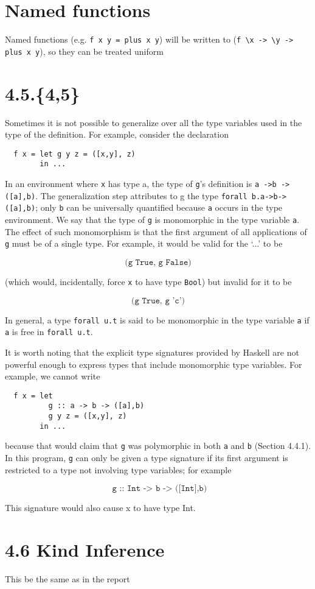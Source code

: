 \documentclass[12pt,a4paper,twoside]{article}
\begin{document}
\section{Named functions}

Named functions (e.g. \texttt{f x y = plus x y}) will be written to (\texttt{f \textbackslash x -> \textbackslash y -> plus x y}), so they can be treated uniform

\section{4.5.\{4,5\}}

Sometimes it is not possible to generalize over all the type variables used in the type of the definition. For example, consider the declaration 

\begin{verbatim}
  f x = let g y z = ([x,y], z)
        in ...
\end{verbatim}

In an environment where \texttt{x} has type a, the type of \texttt{g}'s definition is \texttt{a ->b ->([a],b)}. 
The generalization step attributes to g the type \texttt{forall b.a->b->([a],b)}; 
only \texttt{b} can be universally quantified because \texttt{a} occurs in the type environment. 
We say that the type of \texttt{g} is monomorphic in the type variable \texttt{a}.
The effect of such monomorphism is that the first argument of all applications of \texttt{g} must be of a single type. For example, it would be valid for the `...' to be 

  \[ \texttt{(g True, g False)} \]

(which would, incidentally, force \texttt{x} to have type \texttt{Bool}) but invalid for it to be 

  \[ \texttt{(g True, g 'c')} \]

In general, a type \texttt{forall u.t} is said to be monomorphic in the type variable \texttt{a} if \texttt{a} is free in \texttt{forall u.t}.

It is worth noting that the explicit type signatures provided by Haskell are not powerful enough to express types that include monomorphic type variables. For example, we cannot write 

\begin{verbatim}
  f x = let 
          g :: a -> b -> ([a],b)
          g y z = ([x,y], z)
        in ...
\end{verbatim}

because that would claim that \texttt{g} was polymorphic in both \texttt{a} and \texttt{b} (Section 4.4.1). In this program, \texttt{g} can only be given a type signature if its first argument is restricted to a type not involving type variables; for example 


 \[\texttt{ g :: Int -> b -> ([Int],b)}\]

This signature would also cause x to have type Int.

\section{4.6 Kind Inference}

This be the same as in the report
\end{document}

